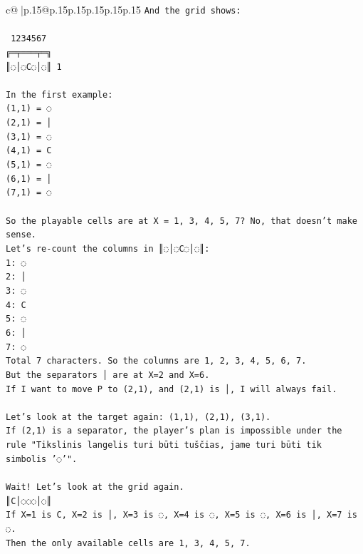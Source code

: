 \documentclass{article}
\begin{document}
{\begin{supertabular}{c@{$\;$}|p{.15\linewidth}@{}p{.15\linewidth}p{.15\linewidth}p{.15\linewidth}p{.15\linewidth}p{.15\linewidth}}
{{{\texttt{And the grid shows:} \\
\\ 
\texttt{ 1234567} \\
\texttt{╔═╤═══╤═╗} \\
\texttt{║◌│◌C◌│◌║ 1} \\
\\ 
\texttt{In the first example:} \\
\texttt{(1,1) = ◌} \\
\texttt{(2,1) = │} \\
\texttt{(3,1) = ◌} \\
\texttt{(4,1) = C} \\
\texttt{(5,1) = ◌} \\
\texttt{(6,1) = │} \\
\texttt{(7,1) = ◌} \\
\\ 
\texttt{So the playable cells are at X = 1, 3, 4, 5, 7? No, that doesn't make sense.} \\
\texttt{Let's re{-}count the columns in ║◌│◌C◌│◌║:} \\
\texttt{1: ◌} \\
\texttt{2: │} \\
\texttt{3: ◌} \\
\texttt{4: C} \\
\texttt{5: ◌} \\
\texttt{6: │} \\
\texttt{7: ◌} \\
\texttt{Total 7 characters. So the columns are 1, 2, 3, 4, 5, 6, 7.} \\
\texttt{But the separators │ are at X=2 and X=6.} \\
\texttt{If I want to move P to (2,1), and (2,1) is │, I will always fail.} \\
\\ 
\texttt{Let's look at the target again: (1,1), (2,1), (3,1).} \\
\texttt{If (2,1) is a separator, the player's plan is impossible under the rule "Tikslinis langelis turi būti tuščias, jame turi būti tik simbolis '◌'".} \\
\\ 
\texttt{Wait! Let's look at the grid again.} \\
\texttt{║C│◌◌◌│◌║} \\
\texttt{If X=1 is C, X=2 is │, X=3 is ◌, X=4 is ◌, X=5 is ◌, X=6 is │, X=7 is ◌.} \\
\texttt{Then the only available cells are 1, 3, 4, 5, 7.} \\
}}}
\end{supertabular}}
\end{document}
